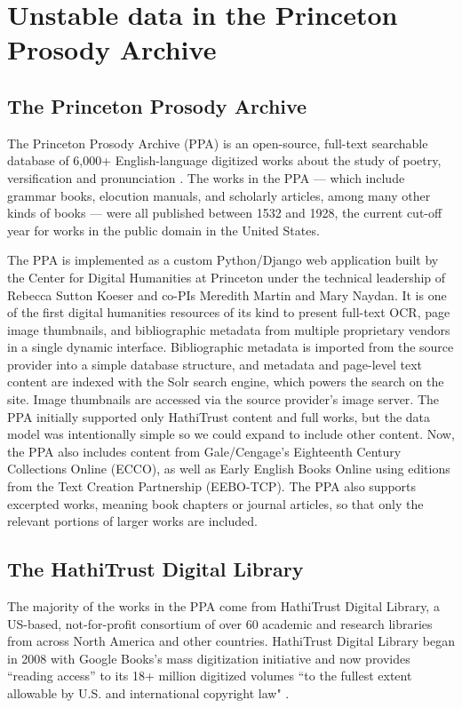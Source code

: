 \documentclass{anthology-ch}         %
\begin{document}
\section{Unstable data in the Princeton Prosody Archive}

\subsection{The Princeton Prosody Archive }

The Princeton Prosody Archive (PPA) is an open-source, full-text searchable database of 6,000+ English-language digitized works about the study of poetry, versification and pronunciation \cite{noauthor_princeton_nodate}. The works in the PPA — which include grammar books, elocution manuals, and scholarly articles, among many other kinds of books — were all published between 1532 and 1928, the current cut-off year for works in the public domain in the United States. 

The PPA is implemented as a custom Python/Django web application built by the Center for Digital Humanities at Princeton under the technical leadership of Rebecca Sutton Koeser and co-PIs Meredith Martin and Mary Naydan. It is one of the first digital humanities resources of its kind to present full-text OCR, page image thumbnails, and bibliographic metadata from multiple proprietary vendors in a single dynamic interface. Bibliographic metadata is imported from the source provider into a simple database structure, and metadata and page-level text content are indexed with the Solr search engine, which powers the search on the site. Image thumbnails are accessed via the source provider’s image server. The PPA initially supported only HathiTrust content and full works, but the data model was intentionally simple so we could expand to include other content. Now, the PPA also includes content from Gale/Cengage’s Eighteenth Century Collections Online (ECCO), as well as Early English Books Online using editions from the Text Creation Partnership (EEBO-TCP). The PPA also supports excerpted works, meaning book chapters or journal articles, so that only the relevant portions of larger works are included. 

\subsection{The HathiTrust Digital Library}

The majority of the works in the PPA come from HathiTrust Digital Library, a US-based, not-for-profit consortium of over 60 academic and research libraries from across North America and other countries. HathiTrust Digital Library began in 2008 with Google Books’s mass digitization initiative and now provides “reading access” to its 18+ million digitized volumes “to the fullest extent allowable by U.S. and international copyright law" \cite{noauthor_welcome_nodate}.
\end{document}
